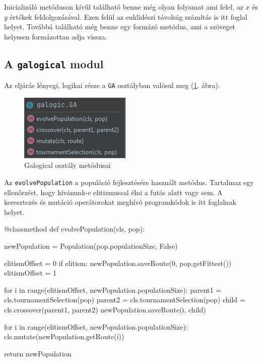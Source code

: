 Inicializáló metóduson kívűl található benne még olyan folyamat ami felel, az $x$ és $y$ értékek feldolgozásával. Ezen felül az euklidészi távolság számítás is itt foglal helyet. Továbbá található még benne egy formázó metódus, ami a szöveget helyesen formázottan adja vissza.

\subsection{A \texttt{galogical} modul}

Az eljárás lényegi, logikai része a \texttt{GA} osztályban valósul meg (\ref{fig:galogical}. ábra).

\begin{figure}[!htb]
\centering
\includegraphics[scale=0.8]{images/galogic.png}
\caption{Galogical osztály metódusai}
\label{fig:galogical}
\end{figure}

Az \texttt{evolvePopulation} a populáció fejlesztésére használt metódus. Tartalmaz egy ellenőrzést, hogy kívánunk-e elitizmussal élni a futás alatt vagy sem. A keresztezés és mutáció operátorokat meghívó programkódok is itt foglalnak helyet.

\begin{python}
@classmethod
def evolvePopulation(cls, pop):

    newPopulation = Population(pop.populationSize, False)

    elitismOffset = 0
    if elitism:
        newPopulation.saveRoute(0, pop.getFittest())
        elitismOffset = 1

    for i in range(elitismOffset, newPopulation.populationSize):
        parent1 = cls.tournamentSelection(pop)
        parent2 = cls.tournamentSelection(pop)
        child = cls.crossover(parent1, parent2)
        newPopulation.saveRoute(i, child)

    for i in range(elitismOffset, newPopulation.populationSize):
        cls.mutate(newPopulation.getRoute(i))

    return newPopulation
\end{python}

